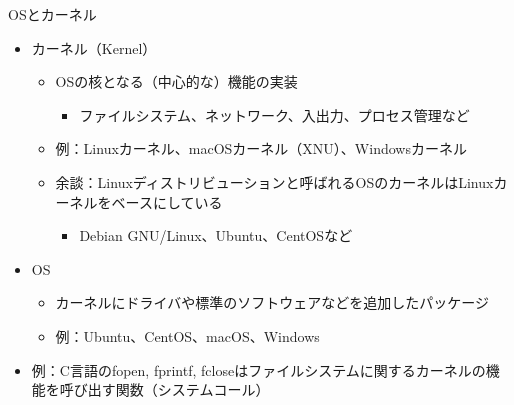 \documentclass[12pt,aspectratio=169]{beamer}
\begin{document}
\begin{frame}{OSとカーネル}
  \begin{itemize}
    \item カーネル（Kernel）
      \begin{itemize}
        \item OSの核となる（中心的な）機能の実装
          \begin{itemize}
            \item ファイルシステム、ネットワーク、入出力、プロセス管理など
          \end{itemize}
        \item 例：Linuxカーネル、macOSカーネル（XNU）、Windowsカーネル
        \item 余談：Linuxディストリビューションと呼ばれるOSのカーネルはLinuxカーネルをベースにしている
          \begin{itemize}
            \item Debian GNU/Linux、Ubuntu、CentOSなど
          \end{itemize}
      \end{itemize}

      \item OS
        \begin{itemize}
          \item カーネルにドライバや標準のソフトウェアなどを追加したパッケージ
          \item 例：Ubuntu、CentOS、macOS、Windows
        \end{itemize}

      \item 例：C言語のfopen, fprintf, fcloseはファイルシステムに関するカーネルの機能を呼び出す関数（システムコール）
  \end{itemize}

\end{frame}
\end{document}
